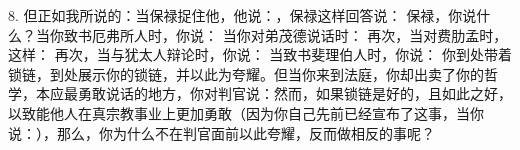 8. 但正如我所说的：当保禄捉住他，他说：，保禄这样回答说：\newline{} 保禄，你说什么？当你致书厄弗所人时，你说：\newline{} 当你对弟茂德说话时：\newline{} 再次，当对费肋孟时，这样：\newline{} 再次，当与犹太人辩论时，你说：\newline{} 当致书斐理伯人时，你说：\newline{} 你到处带着锁链，到处展示你的锁链，并以此为夸耀。但当你来到法庭，你却出卖了你的哲学，本应最勇敢说话的地方，你对判官说：然而，如果锁链是好的，且如此之好，以致能他人在真宗教事业上更加勇敢（因为你自己先前已经宣布了这事，当你说：），那么，你为什么不在判官面前以此夸耀，反而做相反的事呢？\par

